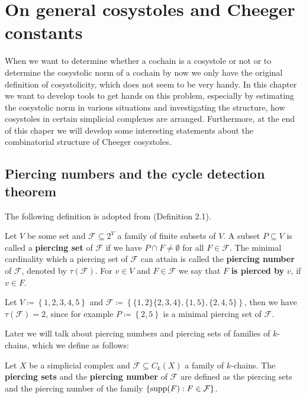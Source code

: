 
\chapter{On general cosystoles and Cheeger constants}

\label{Chapter2}

When we want to determine whether a cochain is a cosystole or not or to determine the cosystolic norm of a cochain by now we only have the original definition of cosystolicity, which does not seem to be very handy. In this chapter we want to develop tools to get hands on this problem, especially by estimating the cosystolic norm in various situations and investigating the structure, how cosystoles in certain simplicial complexes are arranged. Furthermore, at the end of this chaper we will develop some interesting statements about the combinatorial structure of Cheeger cosystoles.

\section{Piercing numbers and the cycle detection theorem}

The following definition is adopted from \cite{6} (Definition 2.1).

\begin{defi}
Let \(V\) be some set and \(\mathcal{F}\subseteq 2^V\) a family of finite subsets of \(V\). A subset \(P\subseteq V\) is called a \textbf{piercing set} of \(\mathcal{F}\) if we have \(P\cap F\neq\emptyset\) for all \(F\in\mathcal{F}\). The minimal cardinality which a piercing set of \(\mathcal{F}\) can attain is called the \textbf{piercing number} of \(\mathcal{F}\), denoted by \(\tau(\mathcal{F})\). For \(v\in V\) and \(F\in\mathcal{F}\) we say that \(F\) \textbf{is pierced by} \(v\), if \(v\in F\).
\end{defi}

\begin{expl}\label{example1}
Let \(V\coloneqq \left\{1,2,3,4,5\right\}\) and \(\mathcal{F}\coloneqq \left\{\{1,2\}\{2,3,4\},\{1,5\},\{2,4,5\}\right\}\), then we have \(\tau(\mathcal{F})=2\), since for example \(P\coloneqq \left\{2,5\right\}\) is a minimal piercing set of \(\mathcal{F}\).
\end{expl}

Later we will talk about piercing numbers and piercing sets of families of \(k\)-chains, which we define as follows:

\begin{defi}
Let \(X\) be a simplicial complex and \(\mathcal{F}\subseteq C_k(X)\) a family of \(k\)-chains. The \textbf{piercing sets} and the \textbf{piercing number} of \(\mathcal{F}\) are defined as the piercing sets and the piercing number of the family \(\left\{\mathrm{supp}(F):F\in\mathcal{F}\right\}\).
\end{defi}

